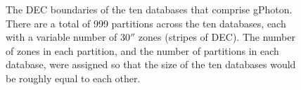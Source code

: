\documentclass[preprint]{aastex}
\begin{document}

\clearpage



\clearpage

\begin{figure}
\caption{The DEC boundaries of the ten databases that comprise gPhoton.  There are a total of 999 partitions across the ten databases, each with a variable number of $30''$ zones (stripes of DEC).  The number of zones in each partition, and the number of partitions in each database, were assigned so that the size of the ten databases would be roughly equal to each other. \label{dbdist}}
\end{figure}
\end{document}
